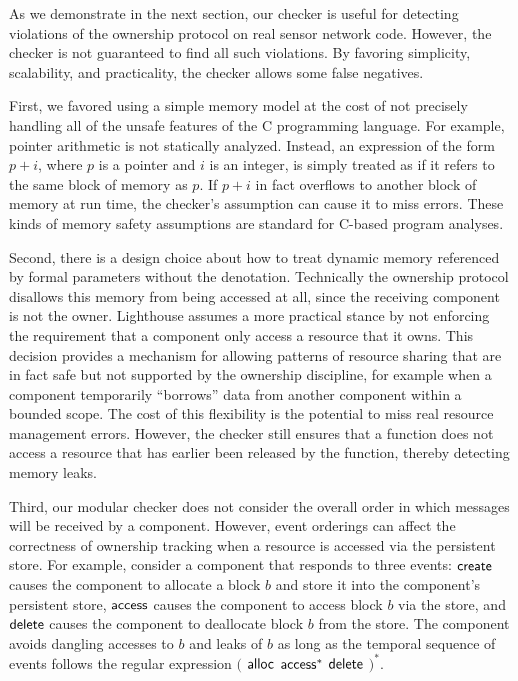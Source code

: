 As we demonstrate in the next section, our checker is useful for detecting
violations of the ownership protocol on real sensor network code.  
%
However, the checker is not guaranteed to find all such violations.  
%
By favoring simplicity, scalability, and practicality, the checker allows some
false negatives.




First, we favored using a simple memory model at the cost of not precisely
handling all of the unsafe features of the C programming language.  
%
For example, pointer arithmetic is not statically analyzed.  
%
Instead, an expression of the form $p+i$, where $p$ is a pointer and $i$ is an
integer, is simply treated as if it refers to the same block of memory as $p$.  
%
If $p+i$ in fact overflows to another block of memory at run time, the
checker's assumption can cause it to miss errors.  
%
These kinds of memory safety assumptions are standard for C-based program
analyses.



Second, there is a design choice about how to treat dynamic memory referenced
by formal parameters without the  denotation.
%
Technically the ownership protocol disallows this memory from being accessed
at all, since the receiving component is not the owner.  
%
Lighthouse assumes a more practical stance by not enforcing the requirement
that a component only access a resource that it owns.
% 
%
This decision 
provides a mechanism for allowing patterns of resource sharing that are in
fact safe but not supported by the ownership discipline, for example when a
component temporarily ``borrows'' data from another component within a bounded
scope.
%
The cost of this flexibility is the potential to miss real resource management
errors.
%
However, the checker still ensures that a function does not access a resource
that has earlier been released by the function, thereby detecting memory
leaks.



Third, our modular checker does not consider the overall order in which
messages will be received by a component.  
%
However, event orderings can affect the correctness of ownership tracking
when a resource is accessed via the persistent store.
%
For example, consider a component that responds to three events: ${\mathsf{create}}$
causes the component to allocate a block $b$ and store it into the
component's persistent store, ${\mathsf{access}}$ causes the component to access block
$b$ via the store, and ${\mathsf{delete}}$ causes the component to deallocate block
$b$ from the store.  
%
The component avoids dangling accesses to $b$ and leaks of $b$ as long as
the temporal sequence of events follows the regular expression $($ ${\mathsf{alloc}}$
${\mathsf{access}}^*$ ${\mathsf{delete}}$ $)^*$.  



